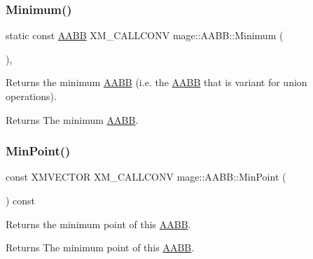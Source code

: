 \subsubsection{\texorpdfstring{Minimum()}{Minimum()}}
{\footnotesize\ttfamily static const \mbox{\hyperlink{classmage_1_1_a_a_b_b}{A\+A\+BB}} X\+M\+\_\+\+C\+A\+L\+L\+C\+O\+NV mage\+::\+A\+A\+B\+B\+::\+Minimum (\begin{DoxyParamCaption}{ }\end{DoxyParamCaption})\hspace{0.3cm}{\ttfamily [static]}, {\ttfamily [noexcept]}}

Returns the minimum \mbox{\hyperlink{classmage_1_1_a_a_b_b}{A\+A\+BB}} (i.\+e. the \mbox{\hyperlink{classmage_1_1_a_a_b_b}{A\+A\+BB}} that is variant for union operations).

\begin{DoxyReturn}{Returns}
The minimum \mbox{\hyperlink{classmage_1_1_a_a_b_b}{A\+A\+BB}}. 
\end{DoxyReturn}
\mbox{\label{classmage_1_1_a_a_b_b_ad351ed7fe9d7031e4d6eb68f4b4d69eb}} 
\subsubsection{\texorpdfstring{Min\+Point()}{MinPoint()}}
{\footnotesize\ttfamily const X\+M\+V\+E\+C\+T\+OR X\+M\+\_\+\+C\+A\+L\+L\+C\+O\+NV mage\+::\+A\+A\+B\+B\+::\+Min\+Point (\begin{DoxyParamCaption}{ }\end{DoxyParamCaption}) const\hspace{0.3cm}{\ttfamily [noexcept]}}

Returns the minimum point of this \mbox{\hyperlink{classmage_1_1_a_a_b_b}{A\+A\+BB}}.

\begin{DoxyReturn}{Returns}
The minimum point of this \mbox{\hyperlink{classmage_1_1_a_a_b_b}{A\+A\+BB}}. 
\end{DoxyReturn}
\mbox{\label{classmage_1_1_a_a_b_b_a57e7a66ec6e418b2a5367e55b98ef547}} 
